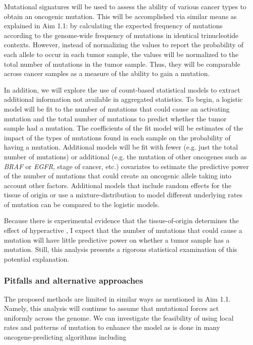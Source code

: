 Mutational signatures will be used to assess the ability of various cancer types to obtain an oncogenic \KRAS{} mutation.
This will be accomplished via similar means as explained in Aim 1.1: by calculating the expected frequency of \KRAS{} mutations according to the genome-wide frequency of mutations in identical trinucleotide contexts.
However, instead of normalizing the values to report the probability of each allele to occur in each tumor sample, the values will be normalized to the total number of mutations in the tumor sample.
Thus, they will be comparable across cancer samples as a measure of the ability to gain a \KRAS{} mutation.

In addition, we will explore the use of count-based statistical models to extract additional information not available in aggregated statistics.
To begin, a logistic model will be fit to the number of mutations that could cause an activating \KRAS{} mutation and the total number of mutations to predict whether the tumor sample had a \KRAS{} mutation.
The coefficients of the fit model will be estimates of the impact of the types of mutations found in each sample on the probability of having a \KRAS{} mutation.
Additional models will be fit with fewer (e.g. just the total number of mutations) or additional (e.g. the mutation of other oncogenes such as \emph{BRAF} or \emph{EGFR}, stage of cancer, etc.) covariates to estimate the predictive power of the number of mutations that could create an oncogenic \KRAS{} allele taking into account other factors.
Additional models that include random effects for the tissue of origin or use a mixture-distribution to model different underlying rates of mutation can be compared to the logistic models.

Because there is experimental evidence that the tissue-of-origin determines the effect of hyperactive \kras{}, I expect that the number of mutations that could cause a \KRAS{} mutation will have little predictive power on whether a tumor sample has a \KRAS{} mutation.
Still, this analysis presents a rigorous statistical examination of this potential explanation.

\subsubsection*{Pitfalls and alternative approaches}

The proposed methods are limited in similar ways as mentioned in Aim 1.1.
Namely, this analysis will continue to assume that mutational forces act uniformly across the genome.
We can investigate the feasibility of using local rates and patterns of mutation to enhance the model as is done in many oncogene-predicting algorithms including \cite{  Lawrence2013, Tamborero2013, Dietlein2020IdentificationContext.}

